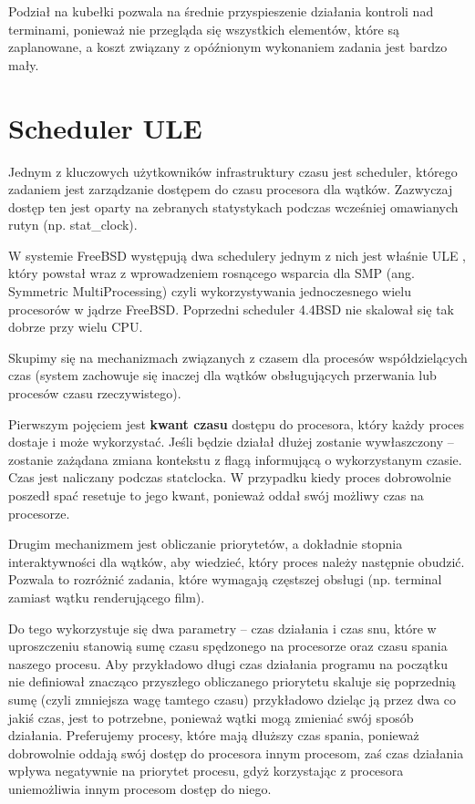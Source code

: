 \documentclass[shortabstract]{iithesis}
\theoremstyle{definition} \newtheorem*{definition}{Definicja}
\theoremstyle{definition} \newtheorem*{example}{Przykład}
\theoremstyle{definition} \newtheorem*{remark}{Uwaga}
\begin{document}
Podział na kubełki pozwala na średnie przyspieszenie działania kontroli nad terminami, ponieważ nie przegląda się wszystkich elementów, które są zaplanowane, a koszt związany z opóźnionym wykonaniem zadania jest bardzo mały.

\section{Scheduler ULE}

Jednym z kluczowych użytkowników infrastruktury czasu jest scheduler, którego zadaniem jest zarządzanie dostępem do czasu procesora dla wątków. Zazwyczaj dostęp ten jest oparty na zebranych statystykach podczas wcześniej omawianych rutyn (np. stat\_clock).

W systemie FreeBSD występują dwa schedulery jednym z nich jest właśnie ULE \cite{bib:ule}, który powstał wraz z wprowadzeniem rosnącego wsparcia dla SMP (ang. Symmetric MultiProcessing) czyli wykorzystywania jednoczesnego wielu procesorów w jądrze FreeBSD. Poprzedni scheduler 4.4BSD \cite{bib:4bsd-sched} nie skalował się tak dobrze przy wielu CPU.

Skupimy się na mechanizmach związanych z czasem dla procesów współdzielących czas (system zachowuje się inaczej dla wątków obsługujących przerwania lub procesów czasu rzeczywistego).

Pierwszym pojęciem jest \textbf{kwant czasu} dostępu do procesora, który każdy proces dostaje i może wykorzystać. Jeśli będzie działał dłużej zostanie wywłaszczony -- zostanie zażądana zmiana kontekstu z flagą informującą o wykorzystanym czasie. Czas jest naliczany podczas statclocka. W przypadku kiedy proces dobrowolnie poszedł spać resetuje to jego kwant, ponieważ oddał swój możliwy czas na procesorze.

Drugim mechanizmem jest obliczanie priorytetów, a dokładnie stopnia interaktywności dla wątków, aby wiedzieć, który proces należy następnie obudzić. Pozwala to rozróżnić zadania, które wymagają częstszej obsługi (np. terminal zamiast wątku renderującego film).

Do tego wykorzystuje się dwa parametry -- czas działania i czas snu, które w uproszczeniu stanowią sumę czasu spędzonego na procesorze oraz czasu spania naszego procesu. Aby przykładowo długi czas działania programu na początku nie definiował znacząco przyszłego obliczanego priorytetu skaluje się poprzednią sumę (czyli zmniejsza wagę tamtego czasu) przykładowo dzieląc ją przez dwa co jakiś czas, jest to potrzebne, ponieważ wątki mogą zmieniać swój sposób działania. Preferujemy procesy, które mają dłuższy czas spania, ponieważ dobrowolnie oddają swój dostęp do procesora innym procesom, zaś czas działania wpływa negatywnie na priorytet procesu, gdyż korzystając z procesora uniemożliwia innym procesom dostęp do niego.
\end{document}
